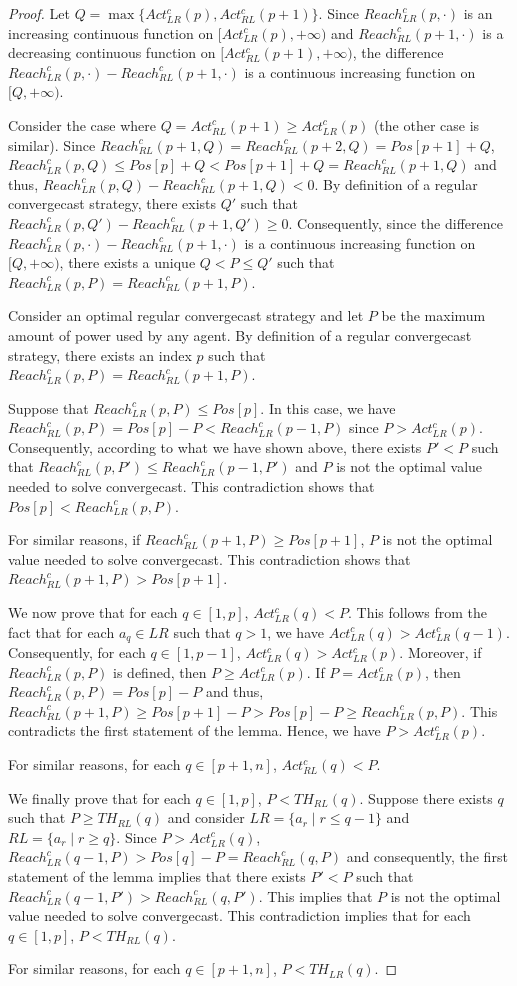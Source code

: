 \documentclass{article}
\newcommand\rclr{Reach_{LR}^c\xspace}
\newcommand\rcrl{Reach_{RL}^c\xspace}
\newcommand\acrl{Act_{RL}^c\xspace}
\newcommand\aclr{Act_{LR}^c\xspace}
\newcommand\convergecast{convergecast\xspace}
\begin{document}
\begin{proof}
Let $Q = \max \{\aclr(p),\acrl(p+1)\}$.  Since
$\rclr(p,\cdot)$ is an increasing continuous function on
$[\aclr(p),+\infty)$ and $\rcrl(p+1,\cdot)$ is a decreasing
continuous function on $[\acrl(p+1),+\infty)$, the difference
$\rclr(p,\cdot) - \rcrl(p+1,\cdot)$ is a continuous
increasing function on $[Q,+\infty)$.

Consider the case where $Q = \acrl(p+1) \geq \aclr(p)$ (the
other case is similar). Since $\rcrl(p+1,Q) = \rcrl(p+2,Q) =
Pos[p+1]+Q$, $\rclr(p,Q) \leq Pos[p]+Q < Pos[p+1]+Q =
\rcrl(p+1,Q)$ and thus, $\rclr(p,Q) - \rcrl(p+1,Q) <
0$.  By definition of a regular convergecast strategy, there exists $Q'$ such that
$\rclr(p,Q') - \rcrl(p+1,Q') \geq 0$. Consequently, since the difference $\rclr(p,\cdot) - \rcrl(p+1,\cdot)$ is a continuous
increasing function on $[Q,+\infty)$, there
exists a unique $Q < P \leq Q'$ such that $\rclr(p,P) =
\rcrl(p+1,P)$.

Consider an optimal regular {\convergecast} strategy and let $P$ be the
maximum amount of power used by any agent. By definition of a regular convergecast strategy,
there
exists an index $p$ such that $\rclr(p,P) = \rcrl(p+1,P)$. 

Suppose that $\rclr(p,P) \leq Pos[p]$. In this case, we have
$\rcrl(p,P) = Pos[p] - P < \rclr(p-1,P)$ since $P >
\aclr(p)$. Consequently, according to  what we have shown above, there
exists $P' < P$ such that $\rcrl(p,P') \leq \rclr(p-1,P')$ and
$P$ is not the optimal value needed to solve {\convergecast}.
This contradiction shows that $Pos[p] <
\rclr(p,P)$.


For similar reasons, if $\rcrl(p+1,P) \geq Pos[p+1]$, $P$ is not the
optimal value needed to solve {\convergecast}. This contradiction shows that
$\rcrl(p+1,P) > Pos[p+1]$.

\medskip
We now prove that for each $q \in [1,p]$, $\aclr(q) < P$. This
follows from the fact that for each $a_q \in LR$ such that $q > 1$, we
have $\aclr(q) > \aclr(q-1)$. Consequently, for each $q \in
[1,p-1]$, $\aclr(q) > \aclr(p)$. Moreover, if $\rclr(p,P)$
is defined, then $P \geq \aclr(p)$. If $P = \aclr(p)$,
then $\rclr(p,P) = Pos[p]-P$ and thus, $\rcrl(p+1,P) \geq
Pos[p+1] - P > Pos[p] - P \geq \rclr(p,P)$. This contradicts the
first statement of the lemma. Hence, we have $P > \aclr(p)$.

For similar reasons, for each $q \in [p+1,n]$, $\acrl(q) < P$. 

\medskip
We finally prove that for each $q \in [1,p]$, $P < TH_{RL}(q)$. Suppose
there exists $q$ such that $P \geq TH_{RL}(q)$ and consider $LR = \{a_r \mid r \leq q-1\}$
and $RL = \{a_r \mid r \geq q\}$. Since $P > \aclr(q)$,
$\rclr(q-1,P) > Pos[q] - P = \rcrl(q,P)$ and consequently,
the first statement of the lemma implies that  there exists $P'
< P$ such that $\rclr(q-1,P') > \rcrl(q,P')$. This
implies that $P$ is not the optimal value needed to solve convergecast. 
This contradiction implies that for each $q \in [1,p]$, $P < TH_{RL}(q)$.

For similar reasons, for each $q \in [p+1,n]$, $P < TH_{LR}(q)$. 
\end{proof}
\end{document}
